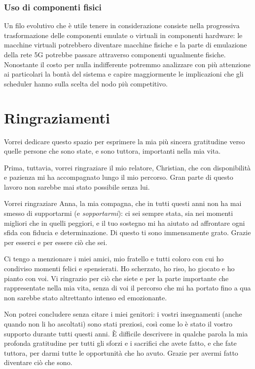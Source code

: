 \documentclass[12pt, hidelinks]{report}
\begin{document}
\subsection*{Uso di componenti fisici}

Un filo evolutivo che è utile tenere in considerazione consiste nella progressiva trasformazione delle componenti emulate o virtuali in componenti hardware: le macchine virtuali potrebbero diventare macchine fisiche e la parte di emulazione della rete 5G potrebbe passare attraverso componenti ugualmente fisiche.
Nonostante il costo per nulla indifferente potremmo analizzare con più attenzione ai particolari la bontà del sistema e capire maggiormente le implicazioni che gli scheduler hanno sulla scelta del nodo più competitivo.





\chapter*{Ringraziamenti}

Vorrei dedicare questo spazio per esprimere la mia più sincera gratitudine verso quelle persone che sono state, e sono tuttora, importanti nella mia vita. 

Prima, tuttavia, vorrei ringraziare il mio relatore, Christian, che con disponibilità e pazienza mi ha accompagnato lungo il mio percorso. Gran parte di questo lavoro non sarebbe mai stato possibile senza lui.

Vorrei ringraziare Anna, la mia compagna, che in tutti questi anni non ha mai smesso di supportarmi (e \textit{sopportarmi}): ci sei sempre stata, sia nei momenti migliori che in quelli peggiori, e il tuo sostegno mi ha aiutato ad affrontare ogni sfida con fiducia e determinazione. Di questo ti sono immensamente grato. Grazie per esserci e per essere ciò che sei.

Ci tengo a menzionare i miei amici, mio fratello e tutti coloro con cui ho condiviso momenti felici e spensierati. Ho scherzato, ho riso, ho giocato e ho pianto con voi. Vi ringrazio per ciò che siete e per la parte importante che rappresentate nella mia vita, senza di voi il percorso che mi ha portato fino a qua non sarebbe stato altrettanto intenso ed emozionante.

Non potrei concludere senza citare i miei genitori: i vostri insegnamenti (anche quando non li ho ascoltati) sono stati preziosi, così come lo è stato il vostro supporto durante tutti questi anni. È difficile descrivere in qualche parola la mia profonda gratitudine per tutti gli sforzi e i sacrifici che avete fatto, e che fate tuttora, per darmi tutte le opportunità che ho avuto. Grazie per avermi fatto diventare ciò che sono.

\restoregeometry
\end{document}
